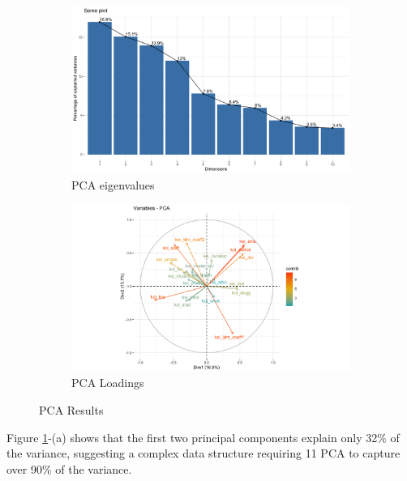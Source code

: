 \begin{figure}[H]
    \centering
    \begin{subfigure}[b]{0.49\textwidth}
        \includegraphics[width=\textwidth]{Immagini/PCA_res.png}
        \caption{PCA eigenvalues}
    \end{subfigure}
    \begin{subfigure}[b]{0.49\textwidth}
        \includegraphics[width=\textwidth]{Immagini/PCA_torta.png}
        \caption{PCA Loadings}
    \end{subfigure}
    \caption{PCA Results}
    \label{fig:pca_plots}
\end{figure}

Figure \ref{fig:pca_plots}-(a) shows that the first two principal components explain only 32\% of the variance, suggesting a complex data structure requiring 11 PCA to capture over 90\% of the variance.


